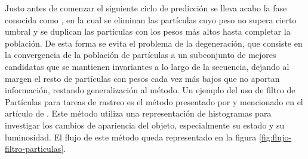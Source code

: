 Justo antes de comenzar el siguiente ciclo de predicción se lleva acabo la fase conocida como , en la cual se eliminan las partículas cuyo peso no supera cierto umbral y se duplican las partículas con los pesos más altos hasta completar la población. De esta forma se evita el problema de la degeneración, que consiste en la convergencia de la población de partículas a un subconjunto de mejores candidatas que se mantienen invariantes a lo largo de la secuencia, dejando al margen el resto de partículas con pesos cada vez más bajos que no aportan información, restando generalización al método. Un ejemplo del uso de filtro de Partículas para tareas de rastreo es el método presentado por \cite{Particle_Filter} y mencionado en el artículo de \cite{Articulo_Concepto_SOT}. Este método utiliza una representación de histogramas para investigar los cambios  de apariencia del objeto, especialmente su estado y su luminosidad. El flujo de este método queda representado en la figura \ref{fig:flujo-filtro-particulas}.

